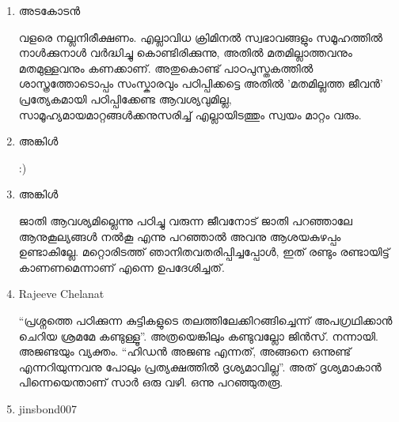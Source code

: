 \begin{enumerate}

\item{അടകോടന്‍}

വളരെ നല്ലനിരീക്ഷണം. എല്ലാവിധ ക്രിമിനല്‍ സ്വഭാവങ്ങളും സമൂഹത്തില്‍ നാള്‍ക്കുനാള്‍ വര്‍ദ്ധിച്ചു കൊണ്ടിരിക്കുന്നു, 
അതില്‍ മതമില്ലാത്തവനും മതമുള്ളവനും കണക്കാണ്. അതുകൊണ്ട് പാഠപുസ്തകത്തില്‍ ശാസ്ത്രത്തോടൊപ്പം സംസ്കാരവും 
പഠിപ്പിക്കട്ടെ അതില്‍ 'മതമില്ലത്ത ജീവന്‍' പ്രത്യേകമായി പഠിപ്പിക്കേണ്ട ആവശ്യവുമില്ല, സാമൂഹ്യമായമാറ്റങ്ങള്‍ക്കനുസരിച്ച് 
എല്ലായിടത്തും സ്വയം മാറ്റം വരും.

\item{അങ്കിള്‍}
    
:)

\item{അങ്കിള്‍}

ജാതി ആവശ്യമില്ലെന്നു പഠിച്ചു വരുന്ന ജീവനോട് ജാതി പറഞ്ഞാലേ ആനുകൂല്യങ്ങള്‍ നല്‍കൂ എന്നു പറഞ്ഞാല്‍ അവനു 
ആശയകുഴപ്പം ഉണ്ടാകില്ലേ. മറ്റൊരിടത്ത് ഞാനിതവതരിപ്പിച്ചപ്പോള്‍, ഇത് രണ്ടും രണ്ടായിട്ട് കാണണമെന്നാണ് എന്നെ 
ഉപദേശിച്ചത്.

\item{Rajeeve Chelanat}

``പ്രശ്നത്തെ പഠിക്കുന്ന കുട്ടികളുടെ തലത്തിലേക്കിറങ്ങിച്ചെന്ന് അപഗ്രഥിക്കാന്‍ ചെറിയ ശ്രമമേ കണ്ടുള്ളൂ''. അത്രയെങ്കിലും 
കണ്ടുവല്ലോ ജിന്‍സ്. നന്നായി. അജണ്ടയും വ്യക്തം. ``ഹിഡന്‍ അജണ്ട എന്നത്, അങ്ങനെ ഒന്നുണ്ട് എന്നറിയുന്നവനു 
പോലും പ്രത്യക്ഷത്തില്‍ ദൃശ്യമാവില്ല''. അത് ദൃശ്യമാകാന്‍ പിന്നെയെന്താണ് സാര്‍ ഒരു വഴി. ഒന്നു പറഞ്ഞുതരൂ.

\item{jinsbond007}


\end{enumerate}
